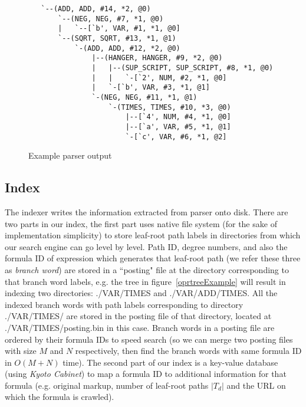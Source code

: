 \begin{figure}
\begin{center}
\begin{verbatim}
   `--(ADD, ADD, #14, *2, @0)
       `--(NEG, NEG, #7, *1, @0)
       |   `--[`b', VAR, #1, *1, @0]
       `--(SQRT, SQRT, #13, *1, @1)
           `-(ADD, ADD, #12, *2, @0)
               |--(HANGER, HANGER, #9, *2, @0)
               |   |--(SUP_SCRIPT, SUP_SCRIPT, #8, *1, @0)
               |   |   `-[`2', NUM, #2, *1, @0]
               |   `-[`b', VAR, #3, *1, @1]
               `-(NEG, NEG, #11, *1, @1)
                   `-(TIMES, TIMES, #10, *3, @0)
                       |--[`4', NUM, #4, *1, @0]
                       |--[`a', VAR, #5, *1, @1]
                       `-[`c', VAR, #6, *1, @2]
\end{verbatim}
\end{center}
\caption{Example parser output}\label{exout}
\end{figure}

\subsection{Index}
The indexer writes the information extracted from parser onto disk. 
There are two parts in our index, the first part uses native file system (for the sake of implementation simplicity) to store leaf-root path labels in directories from which our search engine can go level by level. 
Path ID, degree numbers, and also the formula ID of expression which generates that leaf-root path (we refer these three as \textit{branch word}) are stored in a ``posting" file at the directory corresponding to that branch word labels, 
e.g. the tree in figure~\ref{oprtreeExample} will result in indexing two directories: ./VAR/TIMES and ./VAR/ADD/TIMES. 
All the indexed branch words with path labels corresponding to directory ./VAR/TIMES/ are stored in the posting file of that directory, located at ./VAR/TIMES/posting.bin in this case.
Branch words in a posting file are ordered by their formula IDs to speed search (so we can merge two posting files with size $M$ and $N$ respectively, then find the branch words with same formula ID in $O(M + N)$ time).
The second part of our index is a key-value database (using \textit{Kyoto Cabinet}) to map a formula ID to additional information for that formula (e.g. original markup, number of leaf-root paths $|T_d|$ and the URL on which the formula is crawled).


